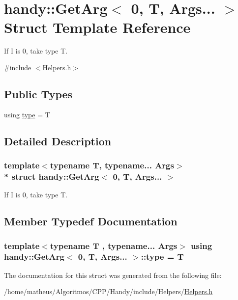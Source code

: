 \hypertarget{structhandy_1_1GetArg_3_010_00_01T_00_01Args_8_8_8_01_4}{}\section{handy\+:\+:Get\+Arg$<$ 0, T, Args... $>$ Struct Template Reference}
\label{structhandy_1_1GetArg_3_010_00_01T_00_01Args_8_8_8_01_4}


If {\ttfamily I} is 0, take type {\ttfamily T}.  




{\ttfamily \#include $<$Helpers.\+h$>$}

\subsection*{Public Types}
\begin{DoxyCompactItemize}
\item 
using \hyperlink{structhandy_1_1GetArg_3_010_00_01T_00_01Args_8_8_8_01_4_ac0c74cd6c4a9e2cc3c5c264f497ce11f}{type} = T
\end{DoxyCompactItemize}


\subsection{Detailed Description}
\subsubsection*{template$<$typename T, typename... Args$>$\\*
struct handy\+::\+Get\+Arg$<$ 0, T, Args... $>$}

If {\ttfamily I} is 0, take type {\ttfamily T}. 

\subsection{Member Typedef Documentation}
\subsubsection[{\texorpdfstring{type}{type}}]{\setlength{\rightskip}{0pt plus 5cm}template$<$typename T , typename... Args$>$ using {\bf handy\+::\+Get\+Arg}$<$ 0, T, Args... $>$\+::{\bf type} =  T}\hypertarget{structhandy_1_1GetArg_3_010_00_01T_00_01Args_8_8_8_01_4_ac0c74cd6c4a9e2cc3c5c264f497ce11f}{}\label{structhandy_1_1GetArg_3_010_00_01T_00_01Args_8_8_8_01_4_ac0c74cd6c4a9e2cc3c5c264f497ce11f}


The documentation for this struct was generated from the following file\+:\begin{DoxyCompactItemize}
\item 
/home/matheus/\+Algoritmos/\+C\+P\+P/\+Handy/include/\+Helpers/\hyperlink{Helpers_2Helpers_8h}{Helpers.\+h}\end{DoxyCompactItemize}
